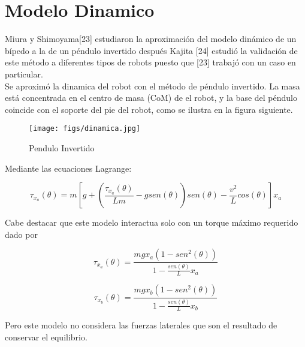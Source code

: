 
\section{Modelo Dinamico}

Miura y Shimoyama[23] estudiaron la aproximación del modelo dinámico de un bípedo a la de un péndulo invertido después Kajita [24] estudió la validación de este método a diferentes tipos de robots puesto que [23] trabajó con un caso en particular.\\

Se aproximó la dinamica del robot con el método de péndulo invertido. La masa está concentrada en el centro de masa (CoM) de el robot, y la base del péndulo coincide con el soporte del pie del robot, como se ilustra en la figura siguiente.


\begin{figure}[h]
	\centering
		\texttt{[image: figs/dinamica.jpg]}
	\caption{Pendulo Invertido}
	\label{fig:dinamica}
\end{figure}


Mediante las ecuaciones Lagrange:

\begin{equation}
	\tau_{x_a}(\theta)=m\left[g+\left(\frac{\tau_{x_a}(\theta)}{Lm}-gsen(\theta)\right)sen(\theta)-\frac{v^2}{L}cos(\theta)\right]x_a
\end{equation}
  
  
Cabe destacar que este modelo interactua solo con un torque máximo requerido dado por


  
  
\begin{equation}
	\tau_{x_a}\left(\theta\right)=\frac{mgx_{a}\left(1-sen^2\left(\theta\right)\right)}{1-\frac{sen\left(\theta\right)}{L}x_a}
\end{equation}

\begin{equation}
		\tau_{x_b}\left(\theta\right)=\frac{mgx_{b}\left(1-sen^2\left(\theta\right)\right)}{1-\frac{sen\left(\theta\right)}{L}x_b}
\end{equation}


Pero este modelo no considera las fuerzas laterales que son el resultado de conservar el equilibrio.

